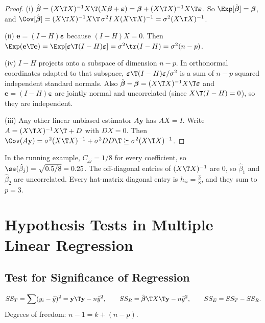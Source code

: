 \begin{proof}
(i) $\hat{\boldsymbol\beta}=(X\T X)^{-1}X\T(X\boldsymbol\beta+\boldsymbol\varepsilon)=\boldsymbol\beta+(X\T X)^{-1}X\T\boldsymbol\varepsilon$. So $\Exp[\hat{\boldsymbol\beta}]=\boldsymbol\beta$, and $\Cov[\hat{\boldsymbol\beta}]=(X\T X)^{-1}X\T\,\sigma^2I\,X(X\T X)^{-1}=\sigma^2(X\T X)^{-1}$.

(ii) $\mathbf{e}=(I-H)\boldsymbol\varepsilon$ because $(I-H)X=0$. Then $\Exp(\mathbf{e}\T\mathbf{e})=\Exp[\boldsymbol\varepsilon\T(I-H)\boldsymbol\varepsilon]=\sigma^2\tr(I-H)=\sigma^2(n-p)$.

(iv) $I-H$ projects onto a subspace of dimension $n-p$. In orthonormal coordinates adapted to that subspace, $\boldsymbol\varepsilon\T(I-H)\boldsymbol\varepsilon/\sigma^2$ is a sum of $n-p$ squared independent standard normals. Also $\hat{\boldsymbol\beta}-\boldsymbol\beta=(X\T X)^{-1}X\T\boldsymbol\varepsilon$ and $\mathbf{e}=(I-H)\boldsymbol\varepsilon$ are jointly normal and uncorrelated (since $X\T(I-H)=0$), so they are independent.

(iii) Any other linear unbiased estimator $A\mathbf{y}$ has $AX=I$. Write $A=(X\T X)^{-1}X\T+D$ with $DX=0$. Then $\Cov(A\mathbf{y})=\sigma^2(X\T X)^{-1}+\sigma^2DD\T\succeq\sigma^2(X\T X)^{-1}$.
\end{proof}

\begin{example}
In the running example, $C_{jj}=1/8$ for every coefficient, so $\se(\hat\beta_j)=\sqrt{0.5/8}=0.25$. The off-diagonal entries of $(X\T X)^{-1}$ are $0$, so $\hat\beta_1$ and $\hat\beta_2$ are uncorrelated. Every hat-matrix diagonal entry is $h_{ii}=\tfrac38$, and they sum to $p=3$.
\end{example}

\section{Hypothesis Tests in Multiple Linear Regression}

\subsection{Test for Significance of Regression}

\begin{definition}
\[ SS_T=\sum(y_i-\bar{y})^2=\mathbf{y}\T\mathbf{y}-n\bar{y}^2,\qquad SS_R=\hat{\boldsymbol\beta}\T X\T\mathbf{y}-n\bar{y}^2,\qquad SS_E=SS_T-SS_R. \]
Degrees of freedom: $n-1=k+(n-p)$.
\end{definition}

